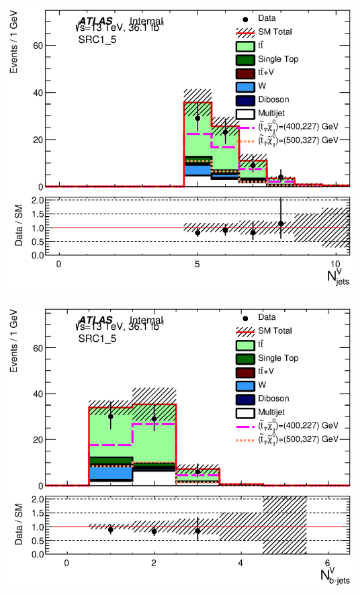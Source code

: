 \begin{figure}[h!]
\begin{center}
    \begin{subfigure}[b]{0.40\textwidth}    
    	 \includegraphics[width=\textwidth]{figures/plotRegion/CA_NjV_SRC1_5.eps}
                \caption{ }
    \end{subfigure}
    \begin{subfigure}[b]{0.40\textwidth}    
    	 \includegraphics[width=\textwidth]{figures/plotRegion/CA_NbV_SRC1_5.eps}
                \caption{ }
    \end{subfigure}
    \begin{subfigure}[b]{0.40\textwidth}    

\end{subfigure}
\end{center}
\end{figure}
